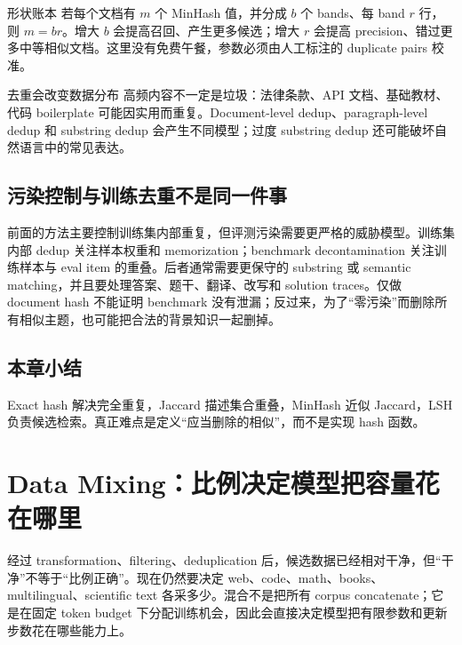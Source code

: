 \documentclass[a4paper]{article}
\begin{document}
\begin{importantbox}{形状账本}
若每个文档有 $m$ 个 MinHash 值，并分成 $b$ 个 bands、每 band $r$ 行，则 $m=br$。增大 $b$ 会提高召回、产生更多候选；增大 $r$ 会提高 precision、错过更多中等相似文档。这里没有免费午餐，参数必须由人工标注的 duplicate pairs 校准。
\end{importantbox}

\begin{warningbox}{去重会改变数据分布}
高频内容不一定是垃圾：法律条款、API 文档、基础教材、代码 boilerplate 可能因实用而重复。Document-level dedup、paragraph-level dedup 和 substring dedup 会产生不同模型；过度 substring dedup 还可能破坏自然语言中的常见表达。
\end{warningbox}


\subsection{污染控制与训练去重不是同一件事}

前面的方法主要控制训练集内部重复，但评测污染需要更严格的威胁模型。训练集内部 dedup 关注样本权重和 memorization；benchmark decontamination 关注训练样本与 eval item 的重叠。后者通常需要更保守的 substring 或 semantic matching，并且要处理答案、题干、翻译、改写和 solution traces。仅做 document hash 不能证明 benchmark 没有泄漏；反过来，为了“零污染”而删除所有相似主题，也可能把合法的背景知识一起删掉。

\subsection{本章小结}

Exact hash 解决完全重复，Jaccard 描述集合重叠，MinHash 近似 Jaccard，LSH 负责候选检索。真正难点是定义“应当删除的相似”，而不是实现 hash 函数。

\section{Data Mixing：比例决定模型把容量花在哪里}

经过 transformation、filtering、deduplication 后，候选数据已经相对干净，但“干净”不等于“比例正确”。现在仍然要决定 web、code、math、books、multilingual、scientific text 各采多少。混合不是把所有 corpus concatenate；它是在固定 token budget 下分配训练机会，因此会直接决定模型把有限参数和更新步数花在哪些能力上。
\end{document}
